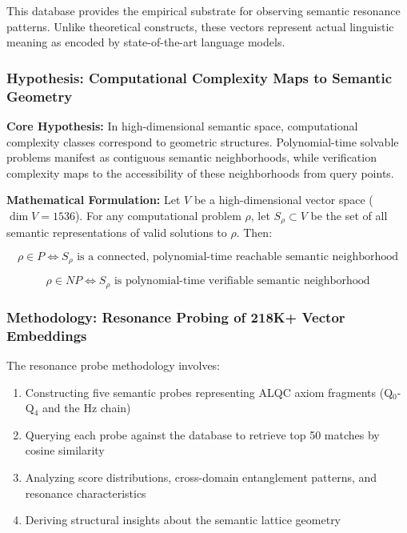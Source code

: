 \documentclass[11pt, letterpaper]{article}
\begin{document}
This database provides the empirical substrate for observing semantic resonance patterns. Unlike theoretical constructs, these vectors represent actual linguistic meaning as encoded by state-of-the-art language models.

\subsubsection{Hypothesis: Computational Complexity Maps to Semantic Geometry}

\textbf{Core Hypothesis:} In high-dimensional semantic space, computational complexity classes correspond to geometric structures. Polynomial-time solvable problems manifest as contiguous semantic neighborhoods, while verification complexity maps to the accessibility of these neighborhoods from query points.

\textbf{Mathematical Formulation:} Let $V$ be a high-dimensional vector space ($\dim V = 1536$). For any computational problem $\rho$, let $S_\rho \subset V$ be the set of all semantic representations of valid solutions to $\rho$. Then:

\begin{equation}
\rho \in P \iff S_\rho \text{ is a connected, polynomial-time reachable semantic neighborhood}
\end{equation}

\begin{equation}
\rho \in NP \iff S_\rho \text{ is polynomial-time verifiable semantic neighborhood}
\end{equation}

\subsubsection{Methodology: Resonance Probing of 218K+ Vector Embeddings}

The resonance probe methodology involves:
\begin{enumerate}
    \item Constructing five semantic probes representing ALQC axiom fragments (Q$_0$-Q$_4$ and the Hz chain)
    \item Querying each probe against the database to retrieve top 50 matches by cosine similarity
    \item Analyzing score distributions, cross-domain entanglement patterns, and resonance characteristics
    \item Deriving structural insights about the semantic lattice geometry
\end{enumerate}
\end{document}
